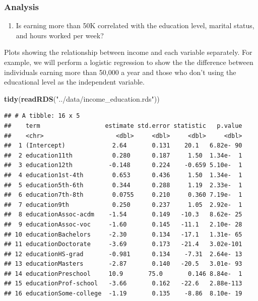 \documentclass[]{article}
\newenvironment{Shaded}{\begin{snugshade}}{\end{snugshade}}
\newcommand{\KeywordTok}[1]{\textcolor[rgb]{0.13,0.29,0.53}{\textbf{#1}}}
\newcommand{\NormalTok}[1]{#1}
\newcommand{\StringTok}[1]{\textcolor[rgb]{0.31,0.60,0.02}{#1}}
\providecommand{\tightlist}{%
  \setlength{\itemsep}{0pt}\setlength{\parskip}{0pt}}
\begin{document}
\hypertarget{analysis}{%
\subsubsection{Analysis}\label{analysis}}

\begin{enumerate}
\def\labelenumi{\arabic{enumi}.}
\tightlist
\item
  Is earning more than 50K correlated with the education level, marital
  status, and hours worked per week?
\end{enumerate}

Plots showing the relationship between income and each variable
separately. For example, we will perform a logistic regression to show
the the difference between individuals earning more than 50,000 a year
and those who don't using the educational level as the independent
variable.

\begin{Shaded}
\begin{Highlighting}[]
\KeywordTok{tidy}\NormalTok{(}\KeywordTok{readRDS}\NormalTok{(}\StringTok{"../data/income\_education.rds"}\NormalTok{))}
\end{Highlighting}
\end{Shaded}

\begin{verbatim}
## # A tibble: 16 x 5
##    term                  estimate std.error statistic   p.value
##    <chr>                    <dbl>     <dbl>     <dbl>     <dbl>
##  1 (Intercept)             2.64       0.131    20.1   6.82e- 90
##  2 education11th           0.280      0.187     1.50  1.34e-  1
##  3 education12th          -0.148      0.224    -0.659 5.10e-  1
##  4 education1st-4th        0.653      0.436     1.50  1.34e-  1
##  5 education5th-6th        0.344      0.288     1.19  2.33e-  1
##  6 education7th-8th        0.0755     0.210     0.360 7.19e-  1
##  7 education9th            0.250      0.237     1.05  2.92e-  1
##  8 educationAssoc-acdm    -1.54       0.149   -10.3   8.62e- 25
##  9 educationAssoc-voc     -1.60       0.145   -11.1   2.10e- 28
## 10 educationBachelors     -2.30       0.134   -17.1   1.31e- 65
## 11 educationDoctorate     -3.69       0.173   -21.4   3.02e-101
## 12 educationHS-grad       -0.981      0.134    -7.31  2.64e- 13
## 13 educationMasters       -2.87       0.140   -20.5   3.01e- 93
## 14 educationPreschool     10.9       75.0       0.146 8.84e-  1
## 15 educationProf-school   -3.66       0.162   -22.6   2.88e-113
## 16 educationSome-college  -1.19       0.135    -8.86  8.10e- 19
\end{verbatim}
\end{document}
